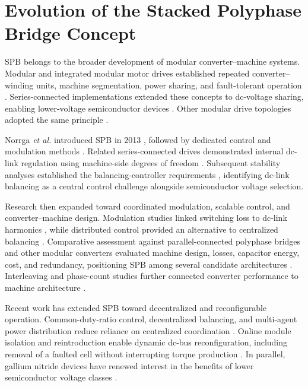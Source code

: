 \section{Evolution of the Stacked Polyphase Bridge Concept}
\label{sec:evolution}

SPB belongs to the broader development of modular converter--machine
systems. Modular and integrated modular motor drives established
repeated converter--winding units, machine segmentation, power sharing,
and fault-tolerant operation \cite{Cengelci2000MMMI,Choi2011IMMD}.
Series-connected implementations extended these concepts to dc-voltage
sharing, enabling lower-voltage semiconductor devices
\cite{Wang2013GaNIMMD,Wang2015GaNIMMD,Wang2025GaNIMMD}. Other modular
drive topologies adopted the same principle
\cite{Wang2015SeriesModular,Ruseler2015InputSeries}.

Norrga \textit{et al.} introduced SPB in 2013 \cite{Norrga2013SPB},
followed by dedicated control and modulation methods
\cite{Jin2014Control}. Related series-connected drives demonstrated
internal dc-link regulation using machine-side degrees of freedom
\cite{Che2014SeriesConnected}. Subsequent stability analyses established
the balancing-controller requirements
\cite{Nikouie2015Stability,Nikouie2017Stability}, identifying dc-link
balancing as a central control challenge alongside semiconductor
voltage selection.

Research then expanded toward coordinated modulation, scalable control,
and converter--machine design. Modulation studies linked switching loss
to dc-link harmonics \cite{Jin2017Modulation}, while distributed control
provided an alternative to centralized balancing \cite{Jin2018Distributed}.
Comparative assessment against parallel-connected polyphase bridges
and other modular converters evaluated machine design, losses,
capacitor energy, cost, and redundancy, positioning SPB among several
candidate architectures \cite{Zhang2017ModularDriveComparison}.
Interleaving and phase-count studies further connected converter
performance to machine architecture
\cite{Verkroost2019Interleaving,VanDamme2019DCLink,Bringezu2020SPB,Verkroost2021Ripple}.

Recent work has extended SPB toward decentralized and reconfigurable
operation. Common-duty-ratio control, decentralized balancing, and
multi-agent power distribution reduce reliance on centralized
coordination \cite{Mocevic2023CDR,Verkroost2024VoltageBalance,Verkroost2024PowerDistribution,Mocevic2024GateDelay}. Online module
isolation and reintroduction enable dynamic dc-bus reconfiguration,
including removal of a faulted cell without interrupting torque
production \cite{Verkroost2024Reconfiguration}. In parallel, gallium
nitride devices have renewed interest in the benefits of lower
semiconductor voltage classes \cite{Rohner2024GaN}.

